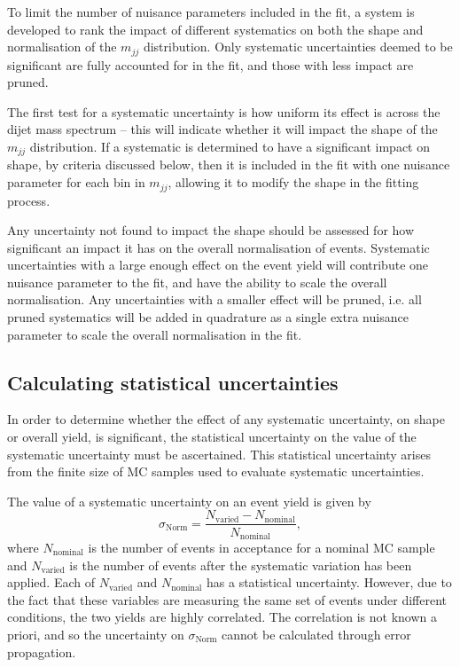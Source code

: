 
To limit the number of nuisance parameters included in the fit, a system is
developed to rank the impact of different systematics on both the shape and
normalisation of the $m_{jj}$ distribution. Only systematic uncertainties deemed
to be significant are fully accounted for in the fit, and those with less impact
are pruned.

The first test for a systematic uncertainty is how uniform its effect is across
the dijet mass spectrum -- this will indicate whether it will impact the shape
of the $m_{jj}$ distribution. If a systematic is determined to have a
significant impact on shape, by criteria discussed below, then it is included in
the fit with one nuisance parameter for each bin in $m_{jj}$, allowing it to
modify the shape in the fitting process.

Any uncertainty not found to impact the shape should be assessed for how
significant an impact it has on the overall normalisation of events. Systematic
uncertainties with a large enough effect on the event yield will contribute one
nuisance parameter to the fit, and have the ability to scale the overall
normalisation. Any uncertainties with a smaller effect will be pruned, i.e. all
pruned systematics will be added in quadrature as a single extra nuisance
parameter to scale the overall normalisation in the fit.

\subsection{Calculating statistical uncertainties}

In order to determine whether the effect of any systematic uncertainty, on shape
or overall yield, is significant, the statistical uncertainty on the value of
the systematic uncertainty must be ascertained. This statistical uncertainty
arises from the finite size of \ac{MC} samples used to evaluate systematic
uncertainties.

The value of a systematic uncertainty on an event yield is given by
%
\begin{equation}
  \sigma_\text{Norm} = \frac{ N_\text{varied} - N_\text{nominal} } {
  N_\text{nominal} },
  \label{eqn:vbs-prune-sigmanorm}
\end{equation}
%
where $N_\text{nominal}$ is the number of events in acceptance for a nominal
\ac{MC} sample and $N_\text{varied}$ is the number of events after the
systematic variation has been applied. Each of $N_\text{varied}$ and
$N_\text{nominal}$ has a statistical uncertainty. However, due to the fact that
these variables are measuring the same set of events under different conditions,
the two yields are highly correlated. The correlation is not known a priori, and
so the uncertainty on $\sigma_\text{Norm}$ cannot be calculated through error
propagation.

